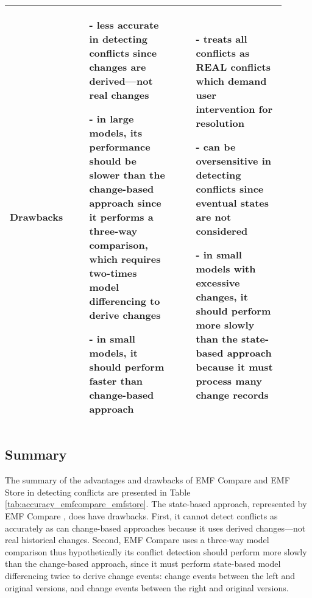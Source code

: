 \begin{table*}[ht]
\begin{scriptsize}
\begin{tabular}{|p{0.1\linewidth}|p{0.4\linewidth}|p{0.4\linewidth}|}
      \\
      \hline
      \multicolumn{1}{|c|}{Drawbacks}
      &
      \begin{minipage}[t]{\linewidth}
        \raggedright
        \begin{itemize}[leftmargin=9pt]
          \setlength\itemsep{2pt}
          \item[-] less accurate in detecting conflicts since changes are derived—not real changes
          \item[-] in large models, its performance should be slower than the change-based approach since it performs a three-way comparison, which requires two-times model differencing to derive changes
          \item[-] in small models, it should perform faster than change-based approach
          \item[]
        \end{itemize}
      \end{minipage}
      &
      \begin{minipage}[t]{\linewidth}
        \raggedright
        \begin{itemize}[leftmargin=9pt]
          \setlength\itemsep{2pt}
          \item[-] treats all conflicts as \textsf{REAL} conflicts which demand user intervention for resolution
          \item[-] can be oversensitive in detecting conflicts since eventual states are not considered
          \item[-] in small models with excessive changes, it should perform more slowly than the state-based approach because it must process many change records
          \item[]
        \end{itemize}
      \end{minipage}
      \\
      \hline
    \end{tabular}
  \end{scriptsize}
\end{table*}

\subsection{Summary}
\label{sec:summary}
The summary of the advantages and drawbacks of EMF Compare and EMF Store in detecting conflicts are presented in Table \ref{tab:accuracy_emfcompare_emfstore}. The state-based approach, represented by EMF Compare \cite{emfcompare2018developer}, does have drawbacks. First, it cannot detect conflicts as accurately as can change-based approaches because it uses derived changes—not real historical changes. Second, EMF Compare uses a three-way model comparison \cite{emfcompare2018developer} thus hypothetically its conflict detection should perform more slowly than the change-based approach, since it must perform state-based model differencing twice to derive change events: change events between the left and original versions, and change events between the right and original versions.


